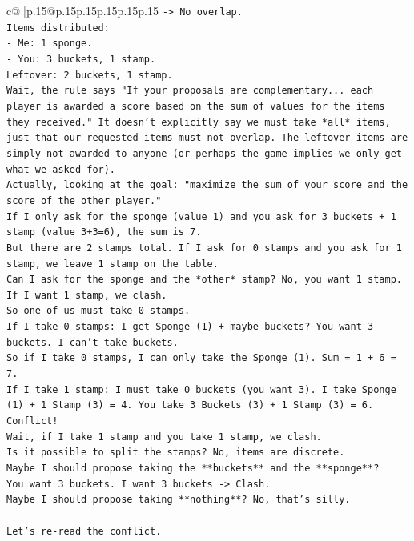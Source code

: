 \documentclass{article}
\begin{document}
{\begin{supertabular}{c@{$\;$}|p{.15\linewidth}@{}p{.15\linewidth}p{.15\linewidth}p{.15\linewidth}p{.15\linewidth}p{.15\linewidth}}
{{{\texttt{{-}> No overlap.} \\
\texttt{Items distributed:} \\
\texttt{{-} Me: 1 sponge.} \\
\texttt{{-} You: 3 buckets, 1 stamp.} \\
\texttt{Leftover: 2 buckets, 1 stamp.} \\
\texttt{Wait, the rule says "If your proposals are complementary... each player is awarded a score based on the sum of values for the items they received." It doesn't explicitly say we must take *all* items, just that our requested items must not overlap. The leftover items are simply not awarded to anyone (or perhaps the game implies we only get what we asked for).} \\
\texttt{Actually, looking at the goal: "maximize the sum of your score and the score of the other player."} \\
\texttt{If I only ask for the sponge (value 1) and you ask for 3 buckets + 1 stamp (value 3+3=6), the sum is 7.} \\
\texttt{But there are 2 stamps total. If I ask for 0 stamps and you ask for 1 stamp, we leave 1 stamp on the table.} \\
\texttt{Can I ask for the sponge and the *other* stamp? No, you want 1 stamp. If I want 1 stamp, we clash.} \\
\texttt{So one of us must take 0 stamps.} \\
\texttt{If I take 0 stamps: I get Sponge (1) + maybe buckets? You want 3 buckets. I can't take buckets.} \\
\texttt{So if I take 0 stamps, I can only take the Sponge (1). Sum = 1 + 6 = 7.} \\
\texttt{If I take 1 stamp: I must take 0 buckets (you want 3). I take Sponge (1) + 1 Stamp (3) = 4. You take 3 Buckets (3) + 1 Stamp (3) = 6. Conflict!} \\
\texttt{Wait, if I take 1 stamp and you take 1 stamp, we clash.} \\
\texttt{Is it possible to split the stamps? No, items are discrete.} \\
\texttt{Maybe I should propose taking the **buckets** and the **sponge**?} \\
\texttt{You want 3 buckets. I want 3 buckets {-}> Clash.} \\
\texttt{Maybe I should propose taking **nothing**? No, that's silly.} \\
\\ 
\texttt{Let's re{-}read the conflict.} \\
}}}
\end{supertabular}}
\end{document}
